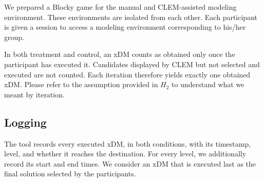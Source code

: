 \documentclass[11pt,a4paper]{article}
\begin{document}
We prepared a Blocky game for the manual and CLEM-assisted modeling environment. 
These environments are isolated from each other. 
Each participant is given a session to access a modeling environment corresponding to his/her group. 

In both treatment and control, an xDM counts as obtained only once the participant has executed it. Candidates displayed by CLEM but not selected and executed are not counted. Each iteration therefore yields exactly one obtained xDM. Please refer to the assumption provided in $H_2$ to understand what we meant by iteration.

\subsection{Logging}

The tool records every executed xDM, in both conditions, with its timestamp, level, and whether it reaches the destination. 
For every level, we additionally record its start and end times. We consider an xDM that is executed last as the final solution selected by the participants. 
\end{document}
